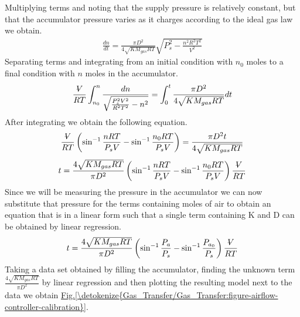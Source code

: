 \documentclass[letterpaper,10pt,english]{sphinxmanual}
\begin{document}
Multiplying terms and noting that the supply pressure is relatively constant, but that the accumulator pressure varies as it charges according to the ideal gas law we obtain.
\begin{equation}\label{equation:Gas_Transfer/Gas_Transfer:Gas_Transfer/Gas_Transfer:13}
\begin{split}\frac{dn}{dt} =\frac{\pi D^{2} }{4\sqrt{KM_{gas} RT} } \sqrt{P_{s}^{2} -\frac{n^{2} R^{2} T^{2} }{V^{2} } }\end{split}
\end{equation}
Separating terms and integrating from an initial condition with \(n_0\) moles to a final condition with \(n\) moles in the accumulator.
\begin{equation}\label{equation:Gas_Transfer/Gas_Transfer:Gas_Transfer/Gas_Transfer:14}
\begin{split}\frac{\rlap{--}V}{RT} \int _{n_{0} }^{n }\frac{dn}{\sqrt{\frac{P_{s}^{2} V^{2} }{R^{2} T^{2} } -n^{2} } }  =\int _{0}^{t}\frac{\pi D^{2} }{4\sqrt{KM_{gas} RT} } dt\end{split}
\end{equation}
After integrating we obtain the following equation.
\begin{equation}\label{equation:Gas_Transfer/Gas_Transfer:Gas_Transfer/Gas_Transfer:15}
\begin{split}\frac{\rlap{--}V}{RT} \left(\sin ^{-1} \frac{n RT}{P_{s} V} -\sin ^{-1} \frac{n_{0} RT}{P_{s} V} \right)=\frac{\pi D^{2} t}{4\sqrt{KM_{gas} RT} }\end{split}
\end{equation}\begin{equation}\label{equation:Gas_Transfer/Gas_Transfer:Gas_Transfer/Gas_Transfer:16}
\begin{split}t=\frac{4\sqrt{KM_{gas} RT} }{\pi D^{2} } \left(\sin ^{-1} \frac{n RT}{P_{s} V} -\sin ^{-1} \frac{n_{0} RT}{P_{s} V} \right)\frac{\rlap{--}V}{RT}\end{split}
\end{equation}
Since we will be measuring the pressure in the accumulator we can now substitute that pressure for the terms containing moles of air to obtain an equation that is in a linear form such that a single term containing K and D can be obtained by linear regression.
\begin{equation}\label{equation:Gas_Transfer/Gas_Transfer:eq_t_fill_accumulator}
\begin{split}t=\frac{4\sqrt{KM_{gas} RT} }{\pi D^{2} } \left(\sin ^{-1} \frac{P_{a } }{P_{s} } -\sin ^{-1} \frac{P_{a_{0} } }{P_{s} } \right)\frac{\rlap{--}V}{RT}\end{split}
\end{equation}
Taking a data set obtained by filling the accumulator, finding the unknown term \(\frac{4\sqrt{KM_{gas} RT} }{\pi D^{2} }\) by linear regression and then plotting the resulting model next to the data we obtain \hyperref[\detokenize{Gas_Transfer/Gas_Transfer:figure-airflow-controller-calibration}]{Fig.\@ \ref{\detokenize{Gas_Transfer/Gas_Transfer:figure-airflow-controller-calibration}}}.
\end{document}
